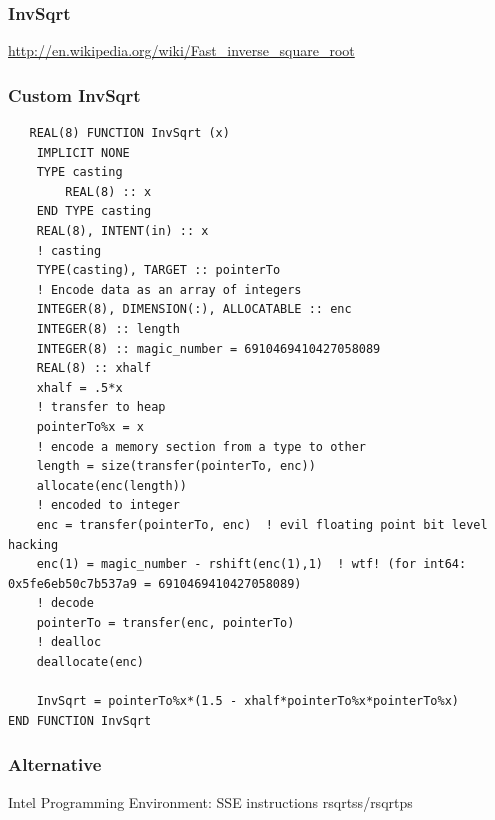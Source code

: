 \documentclass{beamer}
\begin{document}
\begin{frame}
 \frametitle{InvSqrt}
 \url{http://en.wikipedia.org/wiki/Fast_inverse_square_root}
\end{frame}
\begin{frame}[fragile]
 \frametitle{Custom InvSqrt}
  \begin{lstlisting}
   REAL(8) FUNCTION InvSqrt (x)
    IMPLICIT NONE
    TYPE casting
        REAL(8) :: x
    END TYPE casting
    REAL(8), INTENT(in) :: x
    ! casting
    TYPE(casting), TARGET :: pointerTo
    ! Encode data as an array of integers
    INTEGER(8), DIMENSION(:), ALLOCATABLE :: enc
    INTEGER(8) :: length
    INTEGER(8) :: magic_number = 6910469410427058089
    REAL(8) :: xhalf
    xhalf = .5*x
    ! transfer to heap
    pointerTo%x = x
    ! encode a memory section from a type to other
    length = size(transfer(pointerTo, enc))
    allocate(enc(length))
    ! encoded to integer
    enc = transfer(pointerTo, enc)  ! evil floating point bit level hacking
    enc(1) = magic_number - rshift(enc(1),1)  ! wtf! (for int64: 0x5fe6eb50c7b537a9 = 6910469410427058089)
    ! decode
    pointerTo = transfer(enc, pointerTo)
    ! dealloc
    deallocate(enc)

    InvSqrt = pointerTo%x*(1.5 - xhalf*pointerTo%x*pointerTo%x)
END FUNCTION InvSqrt
  \end{lstlisting}

\end{frame}
\begin{frame}
 \frametitle{Alternative}
  Intel Programming Environment: SSE instructions rsqrtss/rsqrtps
\end{frame}
\end{document}
